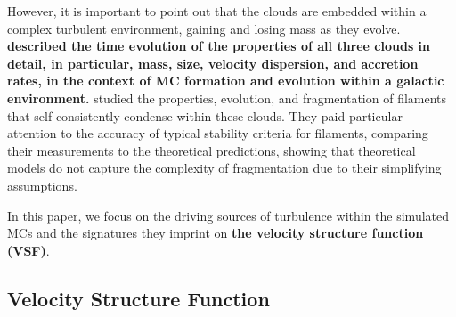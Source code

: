 However, it is important to point out that the clouds are embedded within a complex turbulent environment, gaining and losing mass as they evolve.
\textbf{ described the time evolution of the properties of all three clouds in detail, in particular, mass, size, velocity dispersion, and accretion rates, in the context of MC formation and evolution within a galactic environment.}
 studied the properties, evolution, and fragmentation of filaments that self-consistently condense within these clouds. 
They paid particular attention to the accuracy of typical stability criteria for filaments, comparing their measurements to the theoretical predictions, showing that theoretical models do not capture the complexity of fragmentation due to their simplifying assumptions.

In this paper, we focus on the driving sources of turbulence within the simulated MCs and the signatures they imprint on \textbf{the velocity structure function (VSF)}.


\subsection{Velocity Structure Function}\label{methods:vsf}

